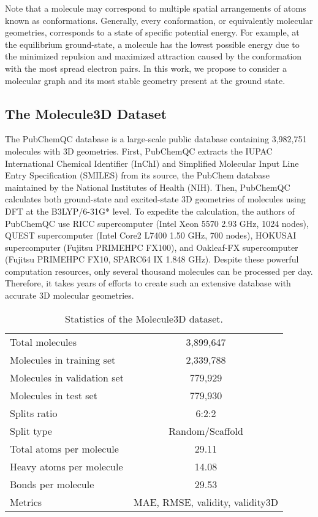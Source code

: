 \documentclass{article}
\begin{document}
Note that a molecule may correspond to multiple spatial arrangements of atoms known as conformations. Generally, every conformation, or equivalently molecular geometries, corresponds to a state of specific potential energy. For example, at the equilibrium ground-state, a molecule has the lowest possible energy due to the minimized repulsion and maximized attraction caused by the conformation with the most spread electron pairs. In this work, we propose to consider a molecular graph and its most stable geometry present at the ground state. 




\subsection{The Molecule3D Dataset}
The PubChemQC database is a large-scale public database containing 3,982,751 molecules with 3D geometries. First, PubChemQC extracts the IUPAC International Chemical Identifier (InChI) and Simplified Molecular Input Line Entry Specification (SMILES) from its source, the PubChem database \cite{kim2016pubchem} maintained by the National Institutes of Health (NIH). Then, PubChemQC calculates both ground-state and excited-state 3D geometries of molecules using DFT at the B3LYP/6-31G* level. To expedite the calculation, the authors of PubChemQC use RICC supercomputer (Intel Xeon 5570 2.93 GHz, 1024 nodes), QUEST supercomputer (Intel Core2 L7400 1.50 GHz, 700 nodes), HOKUSAI supercomputer (Fujitsu PRIMEHPC FX100), and Oakleaf-FX supercomputer (Fujitsu PRIMEHPC FX10, SPARC64 IX 1.848 GHz). Despite these powerful computation resources, only several thousand molecules can be processed per day. Therefore, it takes years of efforts to create such an extensive database with accurate 3D molecular geometries.

\begin{wraptable}{r}{0.65\textwidth}\vspace{-0.5cm}
\small
    \centering
    \caption{Statistics of the Molecule3D dataset.}
    \begin{tabular}{lc}
\toprule
Total molecules & 3,899,647 \\
    Molecules in training set& 2,339,788 \\
    Molecules in validation set& 779,929 \\
    Molecules in test set& 779,930 \\
    Splits ratio & 6:2:2 \\
    Split type & Random/Scaffold \\
    Total atoms per molecule & 29.11 \\
    Heavy atoms per molecule & 14.08 \\
    Bonds per molecule & 29.53 \\
    Metrics & MAE, RMSE, validity, validity3D \\
    \bottomrule
    \end{tabular}
    \label{tab:stat}
\end{wraptable}
\end{document}
